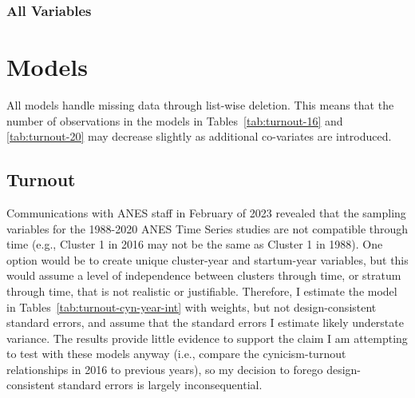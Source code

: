 \documentclass[12pt]{article}
\begin{document}
\begin{appendices}
\begin{refsection}
\subsubsection{All Variables}\label{si:all-vars} %

\clearpage















\section{Models}\label{si:mods}
All models handle missing data through list-wise deletion. This means that the number of observations in the models in Tables~\ref{tab:turnout-16} and \ref{tab:turnout-20} may decrease slightly as additional co-variates are introduced. 

\subsection{Turnout}\label{si:mods:turnout}



Communications with ANES staff in February of 2023 revealed that the sampling variables for the 1988-2020 ANES Time Series studies are not compatible through time (e.g., Cluster 1 in 2016 may not be the same as Cluster 1 in 1988). One option would be to create unique cluster-year and startum-year variables, but this would assume a level of independence between clusters through time, or stratum through time, that is not realistic or justifiable. Therefore, I estimate the model in Tables~\ref{tab:turnout-cyn-year-int} with weights, but not design-consistent standard errors, and assume that the standard errors I estimate likely understate variance. The results provide little evidence to support the claim I am attempting to test with these models anyway (i.e., compare the cynicism-turnout relationships in 2016 to previous years), so my decision to forego design-consistent standard errors is largely inconsequential. 


\end{refsection}
\end{appendices}
\end{document}
